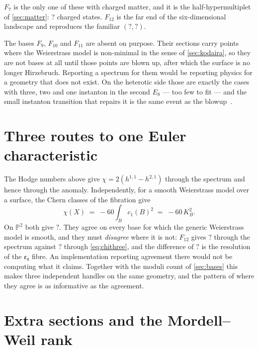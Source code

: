 \documentclass[11pt,a4paper]{article}
\newcommand{\SFFTwelveHone}{?}\newcommand{\SFFTwelveHtwo}{?}
\newcommand{\SFFTwelveChi}{?}\newcommand{\SFFTwelveAlg}{?}
\newcommand{\SFFSevenCharged}{?}\newcommand{\SFPTwoChern}{?}
\newcommand{\SFFTwelveChern}{?}\newcommand{\SFFTwelveGap}{?}
\newcommand{\PP}{\mathbb{P}}
\newcommand{\g}[1]{\mathfrak{#1}}
\theoremstyle{definition}
\begin{document}
\noindent
$F_7$ is the only one of these with charged matter, and it is the
half-hypermultiplet of \cref{sec:matter}: \SFFSevenCharged{} charged states.
$F_{12}$ is the far end of the six-dimensional landscape and reproduces the
familiar $(\SFFTwelveHone, \SFFTwelveHtwo)$.

The bases $F_9$, $F_{10}$ and $F_{11}$ are absent on purpose. Their sections
carry points where the Weierstrass model is non-minimal in the sense of
\cref{sec:kodaira}, so they are not bases at all until those points are blown
up, after which the surface is no longer Hirzebruch. Reporting a spectrum for
them would be reporting physics for a geometry that does not exist. On the
heterotic side those are exactly the cases with three, two and one instanton
in the second $E_8$ --- too few to fit --- and the small instanton transition
that repairs it is the same event as the blowup~\cite{MorrisonVafaII}.


\section{Three routes to one Euler characteristic}
\label{sec:chi}

The Hodge numbers above give $\chi = 2(h^{1,1} - h^{2,1})$ through the
spectrum and hence through the anomaly. Independently, for a smooth
Weierstrass model over a surface, the Chern classes of the fibration
give~\cite{KLRY1998,GrassiMorrison2011}
%
\begin{equation}
\chi(X) \;=\; -60 \int_B c_1(B)^2 \;=\; -60\,K_B^2 .
\label{eq:chithree}
\end{equation}
%
On $\PP^2$ both give $\SFPTwoChern$. They agree on every base for which the
generic Weierstrass model is smooth, and they must \emph{disagree} where it is
not: $F_{12}$ gives $\SFFTwelveChi$ through the spectrum against
$\SFFTwelveChern$ through \cref{eq:chithree}, and the difference of
$\SFFTwelveGap$ is the resolution of the $\g{e}_8$ fibre. An implementation
reporting agreement there would not be computing what it claims. Together with
the moduli count of \cref{sec:bases} this makes three independent handles on
the same geometry, and the pattern of where they agree is as informative as
the agreement.


\section{Extra sections and the Mordell--Weil rank}
\label{sec:mw}
\end{document}
